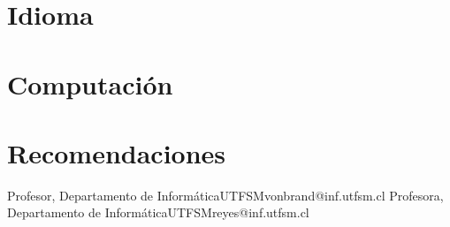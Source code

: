 \documentclass[letter,10pt]{moderncv}
\makeatletter
\renewcommand*{\bibliographyitemlabel}{\@biblabel{\arabic{enumiv}}}
\makeatother
\begin{document}
\section{Idioma}

\section{Computaci\'on}

\section{Recomendaciones}
        {Profesor, Departamento de Informática}{UTFSM}{vonbrand@inf.utfsm.cl}{}
        {Profesora, Departamento de Informática}{UTFSM}{reyes@inf.utfsm.cl}{}


\nocite{*}                                                                           
                                                            
\end{document}
